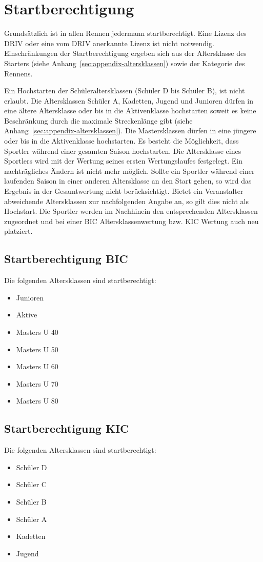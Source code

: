 \section{Startberechtigung}
Grundsätzlich ist in allen Rennen jedermann startberechtigt. Eine Lizenz des DRIV oder eine vom DRIV anerkannte Lizenz ist nicht notwendig. Einschränkungen der Startberechtigung ergeben sich aus der Altersklasse des Starters (siehe Anhang~\ref{sec:appendix-altersklassen}) sowie der Kategorie des Rennens.

Ein Hochstarten der Schüleraltersklassen (Schüler D bis Schüler B), ist nicht erlaubt. Die Altersklassen Schüler A, Kadetten, Jugend und Junioren dürfen in eine ältere Altersklasse oder bis in die Aktivenklasse hochstarten soweit es keine Beschränkung durch die maximale Streckenlänge gibt (siehe Anhang~\ref{sec:appendix-altersklassen}). Die Mastersklassen dürfen in eine jüngere oder bis in die Aktivenklasse hochstarten.
Es besteht die Möglichkeit, dass Sportler während einer gesamten Saison hochstarten. Die Altersklasse eines Sportlers wird mit der Wertung seines ersten Wertungslaufes festgelegt. Ein nachträgliches Ändern ist nicht mehr möglich. Sollte ein Sportler während einer laufenden Saison in einer anderen Altersklasse an den Start gehen, so wird das Ergebnis in der Gesamtwertung nicht berücksichtigt. Bietet ein Veranstalter abweichende Altersklassen zur nachfolgenden Angabe an, so gilt dies nicht als Hochstart. Die Sportler werden im Nachhinein den entsprechenden Altersklassen zugeordnet und bei einer BIC Altersklassenwertung bzw. KIC Wertung auch neu platziert.

\subsection{Startberechtigung BIC}
Die folgenden Altersklassen sind startberechtigt:
\begin{itemize}
	\item Junioren
	\item Aktive
	\item Masters U 40
	\item Masters U 50
	\item Masters U 60
	\item Masters U 70
	\item Masters U 80
\end{itemize}

\subsection{Startberechtigung KIC}
Die folgenden Altersklassen sind startberechtigt:
\begin{itemize}
	\item Schüler D
	\item Schüler C
	\item Schüler B
	\item Schüler A
	\item Kadetten
	\item Jugend
\end{itemize}


